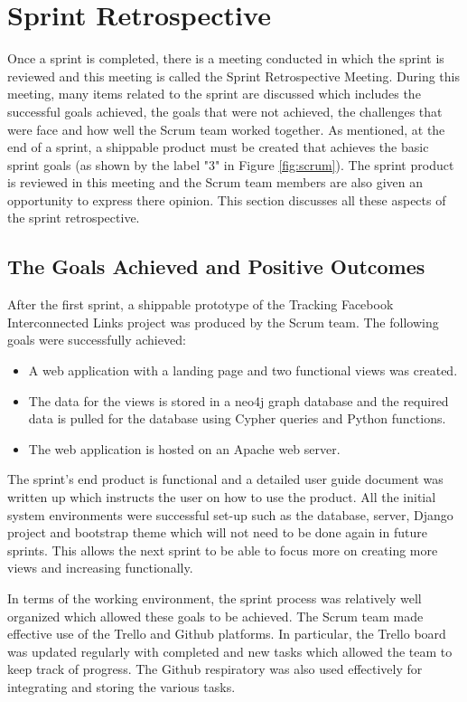 \documentclass[12pt,onecolumn]{article}
\begin{document}
	\section{Sprint Retrospective} \label{retro}
	Once a sprint is completed, there is a meeting conducted in which the sprint is reviewed and this meeting is called the Sprint Retrospective Meeting. During this meeting, many items related to the sprint are discussed which includes the successful goals achieved, the goals that were not achieved, the challenges that were face and how well the Scrum team worked together. As mentioned, at the end of a sprint, a shippable product must be created that achieves the basic sprint goals (as shown by the label "3" in Figure \ref{fig:scrum}). The sprint product is reviewed in this meeting and the Scrum team members are also given an opportunity to express there opinion. This section discusses all these aspects of the sprint retrospective.
	
	\subsection{The Goals Achieved and Positive Outcomes}
	After the first sprint, a shippable prototype of the Tracking Facebook Interconnected Links project was produced by the Scrum team. The following goals were successfully achieved:
	
	\begin{itemize}
		\item A web application with a landing page and two functional views was created.
		\item The data for the views is stored in a neo4j graph database and the required data is pulled for the database using Cypher queries and Python functions.
		\item The web application is hosted on an Apache web server.
	\end{itemize}
	
	The sprint's end product is functional and a detailed user guide document was written up which instructs the user on how to use the product. All the initial system environments were successful set-up such as the database, server, Django project and bootstrap theme which will not need to be done again in future sprints. This allows the next sprint to be able to focus more on creating more views and increasing functionally. 
	
	In terms of the working environment, the sprint process was relatively well organized which allowed these goals to be achieved. The Scrum team made effective use of the Trello and Github platforms. In particular, the Trello board was updated regularly with completed and new tasks which allowed the team to keep track of progress. The Github respiratory was also used effectively for integrating and storing the various tasks.
	
\end{document}
